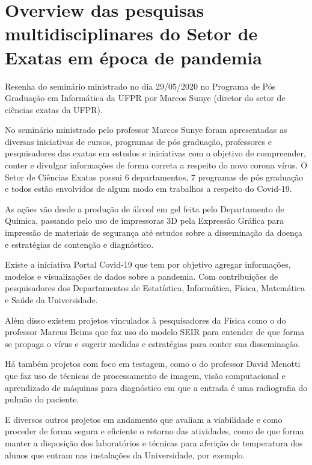 \documentclass[
	12pt,				%
	openright,			%
	twoside,			%
	a4paper,			%
	english,			%
	brazil,				%
	svgnames
	]{abntex2}\usepackage[]{graphicx}\usepackage[]{color}
\begin{document}
\chapter{Overview das pesquisas multidisciplinares do Setor de Exatas em época de pandemia}
\label{cap:res3}


Resenha do seminário ministrado no dia 29/05/2020 no Programa de Pós Graduação em Informática da UFPR por Marcos Sunye (diretor do setor de ciências exatas da UFPR).

No seminário ministrado pelo professor Marcos Sunye foram apresentadas as diversas iniciativas de cursos, programas de pós graduação, professores e pesquisadores das exatas em estudos e iniciativas com o objetivo de compreender, conter e divulgar informações de forma correta a respeito do novo corona vírus.  O Setor de Ciências Exatas possui 6 departamentos, 7 programas de pós graduação e todos estão envolvidos de algum modo em trabalhos a respeito do Covid-19.

As ações vão desde a produção de álcool em gel feita pelo Departamento de Química, passando pelo uso de impressoras 3D pela Expressão Gráfica para impressão de materiais de segurança até estudos sobre a disseminação da doença e estratégias de contenção e diagnóstico.

Existe a iniciativa Portal Covid-19 que tem por objetivo agregar informações, modelos e visualizações de dados sobre a pandemia. Com contribuições de pesquisadores dos Departamentos de Estatística, Informática, Física, Matemática e Saúde da Universidade.

Além disso existem projetos vinculados à pesquisadores da Física como o do professor Marcus Beims que faz uso do modelo SEIR para entender de que forma se propaga o vírus e sugerir medidas e estratégias para conter sua disseminação.

Há também projetos com foco em testagem, como o do professor David Menotti que faz uso de técnicas de processamento de imagem, visão computacional e aprendizado de máquinas para diagnóstico em que a entrada é uma radiografia do pulmão do paciente.

E diversos outros projetos em andamento que avaliam a viabilidade e como proceder de forma segura e eficiente o retorno das atividades, como de que forma manter a disposição dos laboratórios e técnicas para aferição de temperatura dos alunos que entram nas instalações da Universidade, por exemplo.
\end{document}

